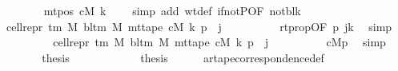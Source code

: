 \begin{isabellebody}
\ \ \ \ \ \ \ \ \isamarkupfalse%
\ {\isacartoucheopen}mt{\isacharunderscore}{\kern0pt}pos\ cM\ k\ {\isasymnoteq}\ {}{\isacartoucheclose}\ \isamarkupfalse%
\ {\isacharparenleft}{\kern0pt}simp\ add{\isacharcolon}{\kern0pt}\ wt{\isacharunderscore}{\kern0pt}def\ if{\isacharunderscore}{\kern0pt}not{\isacharunderscore}{\kern0pt}P{\isacharbrackleft}{\kern0pt}OF\ notblk{\isacharbrackright}{\kern0pt}{\isacharparenright}{\kern0pt}\isanewline
\ \ \ \ \ \ \isamarkupfalse%
\ \isamarkupfalse%
\ {\isachardoublequoteopen}{\isasymdots}\ {\isacharequal}{\kern0pt}\ cell{\isacharunderscore}{\kern0pt}repr\ {\isacharparenleft}{\kern0pt}{\isasymGamma}{\isacharunderscore}{\kern0pt}tm\ M{\isacharparenright}{\kern0pt}\ {\isacharparenleft}{\kern0pt}bl{\isacharunderscore}{\kern0pt}tm\ M{\isacharparenright}{\kern0pt}\ {\isacharparenleft}{\kern0pt}mt{\isacharunderscore}{\kern0pt}tape\ cM\ k\ p{\isacharparenright}{\kern0pt}\ {\isacharbang}{\kern0pt}\ j{\isachardoublequoteclose}\isanewline
\ \ \ \ \ \ \ \ \isamarkupfalse%
\ rtprop{\isacharbrackleft}{\kern0pt}OF\ p{}\ jk{\isacharbrackright}{\kern0pt}\ \isamarkupfalse%
\ simp\isanewline
\ \ \ \ \ \ \isamarkupfalse%
\ \isamarkupfalse%
\ {\isachardoublequoteopen}{\isasymdots}\ {\isacharequal}{\kern0pt}\ cell{\isacharunderscore}{\kern0pt}repr\ {\isacharparenleft}{\kern0pt}{\isasymGamma}{\isacharunderscore}{\kern0pt}tm\ M{\isacharparenright}{\kern0pt}\ {\isacharparenleft}{\kern0pt}bl{\isacharunderscore}{\kern0pt}tm\ M{\isacharparenright}{\kern0pt}\ {\isacharparenleft}{\kern0pt}mt{\isacharunderscore}{\kern0pt}tape\ cM{\isacharunderscore}{\kern0pt}{}\ k\ p{\isacharparenright}{\kern0pt}\ {\isacharbang}{\kern0pt}\ j{\isachardoublequoteclose}\isanewline
\ \ \ \ \ \ \ \ \isamarkupfalse%
\ cM{}p\ \isamarkupfalse%
\ simp\isanewline
\ \ \ \ \ \ \isamarkupfalse%
\ \isamarkupfalse%
\ {\isacharquery}{\kern0pt}thesis\ \isakeywordONE{{\isachardot}{\kern0pt}}\isamarkupfalse%
\isanewline
\ \ \ \ \isamarkupfalse%
\isanewline
\ \ \isamarkupfalse%
\isanewline
\ \ \isamarkupfalse%
\ {\isacharquery}{\kern0pt}thesis\isanewline
\ \ \ \ \isamarkupfalse%
\ ar{\isacharunderscore}{\kern0pt}tape{\isacharunderscore}{\kern0pt}correspondence{\isacharunderscore}{\kern0pt}def\ \isamarkupfalse%

\end{isabellebody}
